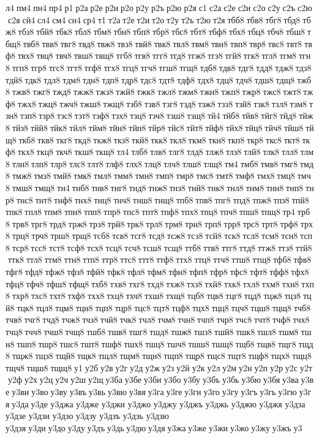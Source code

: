 л4 пм4 пн4 пр4 р1 р2а р2е р2и р2о р2у р2ъ р2ю р2я с1 с2а с2е с2и с2о с2у с2ъ с2ю с2я сй4 сл4 см4 сн4 ср4 т1 т2а т2е т2и т2о т2у т2ъ т2ю т2я тбб8 тбв8 тбг8 тбд8 тбж8 тбз8 тбй8 тбк8 тбл8 тбм8 тбн8 тбп8 тбр8 тбс8 тбт8 тбф8 тбх8 тбц8 тбч8 тбш8 тбщ8 твб8 твв8 твг8 твд8 твж8 твз8 твй8 твк8 твл8 твм8 твн8 твп8 твр8 твс8 твт8 твф8 твх8 твц8 твч8 твш8 твщ8 тгб8 тгв8 тгг8 тгд8 тгж8 тгз8 тгй8 тгк8 тгл8 тгм8 тгн8 тгп8 тгр8 тгс8 тгт8 тгф8 тгх8 тгц8 тгч8 тгш8 тгщ8 тдб8 тдв8 тдг8 тдд8 тдж8 тдз8 тдй8 тдк8 тдл8 тдм8 тдн8 тдп8 тдр8 тдс8 тдт8 тдф8 тдх8 тдц8 тдч8 тдш8 тдщ8 тжб8 тжв8 тжг8 тжд8 тжж8 тжз8 тжй8 тжк8 тжл8 тжм8 тжн8 тжп8 тжр8 тжс8 тжт8 тжф8 тжх8 тжц8 тжч8 тжш8 тжщ8 тзб8 тзв8 тзг8 тзд8 тзж8 тзз8 тзй8 тзк8 тзл8 тзм8 тзн8 тзп8 тзр8 тзс8 тзт8 тзф8 тзх8 тзц8 тзч8 тзш8 тзщ8 тй4 тйб8 тйв8 тйг8 тйд8 тйж8 тйз8 тйй8 тйк8 тйл8 тйм8 тйн8 тйп8 тйр8 тйс8 тйт8 тйф8 тйх8 тйц8 тйч8 тйш8 тйщ8 ткб8 ткв8 ткг8 ткд8 ткж8 ткз8 ткй8 ткк8 ткл8 ткм8 ткн8 ткп8 ткр8 ткс8 ткт8 ткф8 ткх8 ткц8 ткч8 ткш8 ткщ8 тл4 тлб8 тлв8 тлг8 тлд8 тлж8 тлз8 тлй8 тлк8 тлл8 тлм8 тлн8 тлп8 тлр8 тлс8 тлт8 тлф8 тлх8 тлц8 тлч8 тлш8 тлщ8 тм4 тмб8 тмв8 тмг8 тмд8 тмж8 тмз8 тмй8 тмк8 тмл8 тмм8 тмн8 тмп8 тмр8 тмс8 тмт8 тмф8 тмх8 тмц8 тмч8 тмш8 тмщ8 тн4 тнб8 тнв8 тнг8 тнд8 тнж8 тнз8 тнй8 тнк8 тнл8 тнм8 тнн8 тнп8 тнр8 тнс8 тнт8 тнф8 тнх8 тнц8 тнч8 тнш8 тнщ8 тпб8 тпв8 тпг8 тпд8 тпж8 тпз8 тпй8 тпк8 тпл8 тпм8 тпн8 тпп8 тпр8 тпс8 тпт8 тпф8 тпх8 тпц8 тпч8 тпш8 тпщ8 тр4 трб8 трв8 трг8 трд8 трж8 трз8 трй8 трк8 трл8 трм8 трн8 трп8 трр8 трс8 трт8 трф8 трх8 трц8 трч8 трш8 трщ8 тсб8 тсв8 тсг8 тсд8 тсж8 тсз8 тсй8 тск8 тсл8 тсм8 тсн8 тсп8 тср8 тсс8 тст8 тсф8 тсх8 тсц8 тсч8 тсш8 тсщ8 ттб8 ттв8 ттг8 ттд8 ттж8 ттз8 ттй8 ттк8 ттл8 ттм8 ттн8 ттп8 ттр8 ттс8 ттт8 ттф8 ттх8 ттц8 ттч8 ттш8 ттщ8 тфб8 тфв8 тфг8 тфд8 тфж8 тфз8 тфй8 тфк8 тфл8 тфм8 тфн8 тфп8 тфр8 тфс8 тфт8 тфф8 тфх8 тфц8 тфч8 тфш8 тфщ8 тхб8 тхв8 тхг8 тхд8 тхж8 тхз8 тхй8 тхк8 тхл8 тхм8 тхн8 тхп8 тхр8 тхс8 тхт8 тхф8 тхх8 тхц8 тхч8 тхш8 тхщ8 тцб8 тцв8 тцг8 тцд8 тцж8 тцз8 тцй8 тцк8 тцл8 тцм8 тцн8 тцп8 тцр8 тцс8 тцт8 тцф8 тцх8 тцц8 тцч8 тцш8 тцщ8 тчб8 тчв8 тчг8 тчд8 тчж8 тчз8 тчй8 тчк8 тчл8 тчм8 тчн8 тчп8 тчр8 тчс8 тчт8 тчф8 тчх8 тчц8 тчч8 тчш8 тчщ8 тшб8 тшв8 тшг8 тшд8 тшж8 тшз8 тшй8 тшк8 тшл8 тшм8 тшн8 тшп8 тшр8 тшс8 тшт8 тшф8 тшх8 тшц8 тшч8 тшш8 тшщ8 тщб8 тщв8 тщг8 тщд8 тщж8 тщз8 тщй8 тщк8 тщл8 тщм8 тщн8 тщп8 тщр8 тщс8 тщт8 тщф8 тщх8 тщц8 тщч8 тщш8 тщщ8 у1 у2б у2в у2г у2д у2ж у2з у2й у2к у2л у2м у2н у2п у2р у2с у2т у2ф у2х у2ц у2ч у2ш у2щ у3ба у3бе у3би у3бо у3бу у3бъ у3бь у3бю у3бя у3ва у3ве у3ви у3во у3ву у3въ у3вь у3вю у3вя у3га у3ге у3ги у3го у3гу у3гъ у3гь у3гю у3гя у3да у3де 	у3джа 	у3дже 	у3джи 	у3джо 	у3джу 	у3джъ 	у3джь 	у3джю 	у3джя 	у3дза 	у3дзе 	у3дзи 	у3дзо 	у3дзу 	у3дзъ 	у3дзь 	у3дзю 	у3дзя у3ди у3до у3ду у3дъ у3дь у3дю у3дя у3жа у3же у3жи у3жо у3жу у3жъ у3